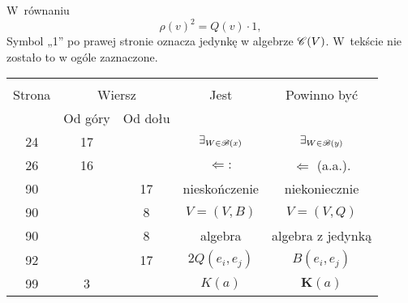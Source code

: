 \documentclass[a4paper,11pt]{article}
\begin{document}



 W~równaniu
\begin{equation}
  \label{eq:MaurinAnalizaOgolneStrukturyVolII-01}
  \rho( v )^{ 2 } = Q( v ) \cdot 1,
\end{equation}
Symbol „1” po prawej stronie oznacza jedynkę w algebrze $\mathcal{C}( V )$. W~tekście nie zostało to w ogóle zaznaczone.






\begin{center}

  \begin{tabular}{|c|c|c|c|c|}
    \hline
    & \multicolumn{2}{c|}{} & & \\
    Strona & \multicolumn{2}{c|}{Wiersz} & Jest
                              & Powinno być \\ \cline{2-3}
    & Od góry & Od dołu & & \\
    \hline
    24  & 17 & & $\exists_{ \substack{ W \in \mathcal{B}( x ) } }$
           & $\exists_{ \substack{ W \in \mathcal{B}( y ) } }$ \\
    26  & 16 & & $\Leftarrow:$ & $\Leftarrow$ (a.a.). \\
    90  & & 17 & nieskończenie & niekoniecznie \\
    90  & &  8 & $V = ( V, B )$ & $V = ( V, Q )$ \\
    90  & &  8 & algebra & algebra z jedynką \\
    92  & & 17 & $2Q( e_{ i }, e_{ j } )$ & $B( e_{ i }, e_{ j } )$ \\
    99  &  3 & & $K( a )$ & $\mathbf{K}( a )$ \\
    \hline
  \end{tabular}

\end{center}
\end{document}
